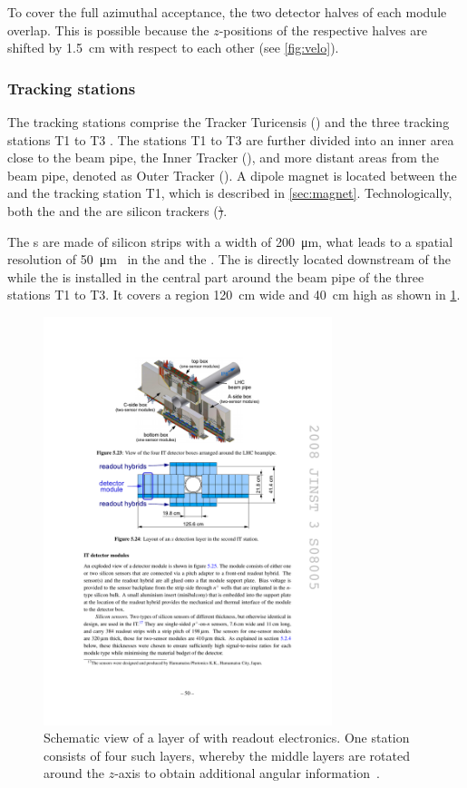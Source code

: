 To cover the full azimuthal acceptance, the two detector halves of each module overlap.
This is possible because the $z$-positions of the respective halves are shifted by \SI{1.5}{\centi\metre} with respect to each other (see \cref{fig:velo}).

\subsubsection*{Tracking stations}
\label{sec:trackingStations}

The tracking stations comprise the Tracker Turicensis (\ttracker) and the three tracking stations T1 to T3 .
The stations T1 to T3 are further divided into an inner area close to the beam pipe, the Inner Tracker (\intr), and more distant areas from the beam pipe, denoted as Outer Tracker (\ot).
A dipole magnet is located between the \ttracker and the tracking station T1, which is described in \cref{sec:magnet}.
Technologically, both the \ttracker and the \intr are silicon trackers (\st).

The \st{}s are made of silicon strips with a width of \SI{200}{\micro\metre}, what leads to a spatial resolution of \SI{50}{\micro\metre}~\cite{Aaij:2014jba} in the \intr and the \ttracker.
The \ttracker is directly located downstream of the \richone while the \intr is installed in the central part around the beam pipe of the three stations T1 to T3.
It covers a region \SI{120}{\centi\metre} wide and \SI{40}{\centi\metre} high as shown in \cref{fig:InnerTracker}.
\begin{figure}[tbp]
    \centering
    \includegraphics[width=0.75\textwidth]{05lhcb/figs/IT.pdf}
    \caption{Schematic view of a layer of \intr with readout electronics.
    One station consists of four such layers, whereby the middle layers are rotated around the $z$-axis to obtain additional angular information~\cite{Alves:2008zz}.}
    \label{fig:InnerTracker}
\end{figure}

